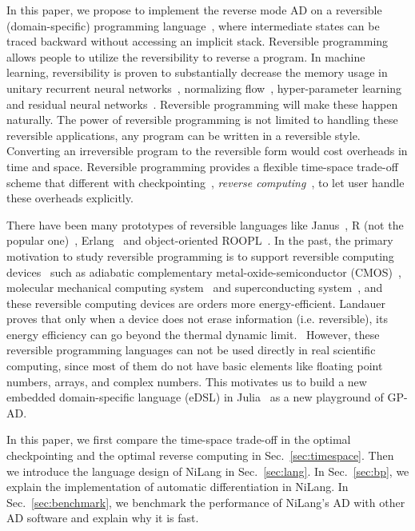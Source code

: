\documentclass{article}
\newcommand{\<}{\langle}
\renewcommand{\>}{\rangle}
\renewcommand{\cite}[1]{{\citep{#1}}}
\newcommand{\Sec}[1]{Sec.~\ref{#1}}
\theoremstyle{definition}\newtheorem{definition}{\textit{Definition}}
\begin{document}
In this paper, we propose to implement the reverse mode AD on a reversible (domain-specific) programming language~\cite{Perumalla2013,Frank2017}, where intermediate states can be traced backward without accessing an implicit stack.
Reversible programming allows people to utilize the reversibility to reverse a program.
In machine learning, reversibility is proven to substantially decrease the memory usage in unitary recurrent neural networks~\cite{MacKay2018}, normalizing flow~\cite{Dinh2014}, hyper-parameter learning~\cite{Maclaurin2015} and residual neural networks~\cite{Gomez2017, Behrmann2018}.
Reversible programming will make these happen naturally.
The power of reversible programming is not limited to handling these reversible applications, any program can be written in a reversible style.
Converting an irreversible program to the reversible form would cost overheads in time and space.
Reversible programming provides a flexible time-space trade-off scheme that different with checkpointing~\cite{Griewank1992,Griewank2008, Chen2016}, \textit{reverse computing}~\cite{Bennett1989,Levine1990}, to let user handle these overheads explicitly.

There have been many prototypes of reversible languages like Janus~\cite{Lutz1986}, R (not the popular one)~\cite{Frank1997}, Erlang~\cite{Lanese2018} and object-oriented ROOPL~\cite{Haulund2017}.
In the past, the primary motivation to study reversible programming is to support reversible computing devices~\cite{Frank1999} such as adiabatic complementary metal-oxide-semiconductor (CMOS)~\cite{Koller1992}, molecular mechanical computing system~\cite{Merkle2018} and superconducting system~\cite{Likharev1977,Semenov2003,Takeuchi2014,Takeuchi2017}, and these reversible computing devices are orders more energy-efficient. Landauer proves that only when a device does not erase information (i.e. reversible), its energy efficiency can go beyond the thermal dynamic limit.~\cite{Landauer1961,Reeb2014}
However, these reversible programming languages can not be used directly in real scientific computing, since most of them do not have basic elements like floating point numbers, arrays, and complex numbers. This motivates us to build a new embedded domain-specific language (eDSL) in Julia~\cite{Bezanson2012,Bezanson2017} as a new playground of GP-AD.

    In this paper, we first compare the time-space trade-off in the optimal checkpointing and the optimal reverse computing in \Sec{sec:timespace}.
    Then we introduce the language design of NiLang in \Sec{sec:lang}.
    In \Sec{sec:bp}, we explain the implementation of automatic differentiation in NiLang.
    In \Sec{sec:benchmark}, we benchmark the performance of NiLang's AD with other AD software and explain why it is fast.
\end{document}
